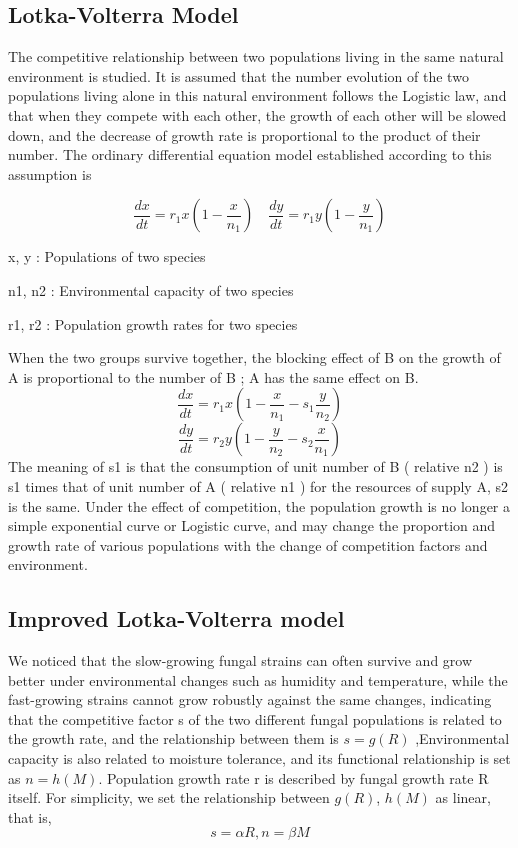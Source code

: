 \documentclass{mcmthesis}
\begin{document}
\subsection{Lotka-Volterra Model}
The competitive relationship between two populations living in the same natural environment is studied. It is assumed that the number evolution of the two populations living alone in this natural environment follows the Logistic law, and that when they compete with each other, the growth of each other will be slowed down, and the decrease of growth rate is proportional to the product of their number. The ordinary differential equation model established according to this assumption is 

 $$\frac{d x}{d t}=r_{1} x\left(1-\frac{x}{n_{1}}\right) \quad \frac{d y}{d t}=r_{1} y\left(1-\frac{y}{n_{1}}\right)$$
 
x, y : Populations of two species

n1, n2 : Environmental capacity of two species             

r1, r2 : Population growth rates for two species             

When the two groups survive together, the blocking effect of B on the growth of A is proportional to the number of B ; A has the same effect on B.
$$\frac{d x}{d t}=r_{1} x\left(1-\frac{x}{n_{1}}-s_{1} \frac{y}{n_{2}}\right)$$ 
$$\frac{d y}{d t}=r_{2} y\left(1-\frac{y}{n_{2}}-s_{2} \frac{x}{n_{1}}\right)$$
The meaning of s1 is that the consumption of unit number of B ( relative n2 ) is s1 times that of unit number of A ( relative n1 ) for the resources of supply A, s2 is the same. Under the effect of competition, the population growth is no longer a simple exponential curve or Logistic curve, and may change the proportion and growth rate of various populations with the change of competition factors and environment.
\subsection{Improved Lotka-Volterra model}
We noticed that the slow-growing fungal strains can often survive and grow better under environmental changes such as humidity and temperature, while the fast-growing strains cannot grow robustly against the same changes, indicating that the competitive factor s of the two different fungal populations is related to the growth rate, and the relationship between them is $s=g(R)$ ,Environmental capacity is also related to moisture tolerance, and its functional relationship is set as $ n = h ( M ) $. Population growth rate r is described by fungal growth rate R itself. For simplicity, we set the relationship between $ g ( R ) $, $ h ( M ) $ as linear, that is, $$s=\alpha R,n=\beta M$$
\end{document}
